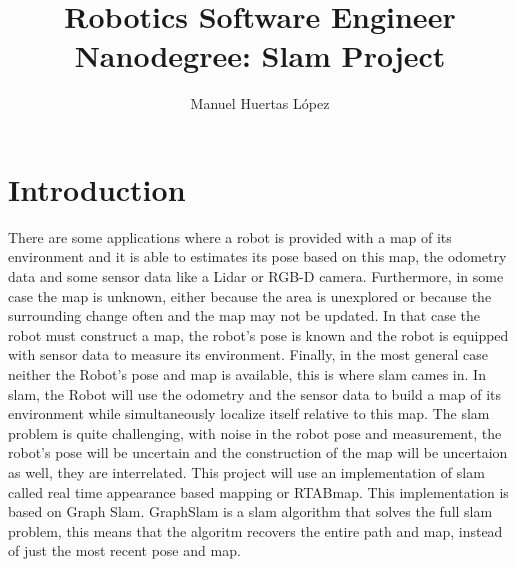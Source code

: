 \documentclass[10pt,journal,compsoc]{IEEEtran}
\begin{document}
	
\title{Robotics Software Engineer Nanodegree: Slam Project}
\author{Manuel Huertas L\'opez}

	
	
\maketitle
\IEEEdisplaynontitleabstractindextext
\IEEEpeerreviewmaketitle
\section{Introduction}
\label{sec:introduction}
\IEEEPARstart
{T}{here} are some applications where a robot is provided with a map of its environment and it is able to estimates its pose based on this map, the odometry data and some sensor data like a Lidar or RGB-D camera. Furthermore, in some case the map is unknown, either because the area is unexplored or because the surrounding change often and the map may not be updated. In that case the robot must construct a map, the robot's pose is known and the robot is equipped with sensor data to measure its environment. Finally, in the most general case neither the Robot's pose and map is available, this is where slam cames in. In slam, the Robot will use the odometry and the sensor data to build a map of its environment while simultaneously localize itself relative to this map. The slam problem is quite challenging, with noise in the robot pose and measurement, the robot's pose will be uncertain and the construction of the map will be uncertaion as well, they are interrelated. This project will use an implementation of slam called real time appearance based mapping or RTABmap. This implementation is based on Graph Slam. GraphSlam is a slam algorithm that solves the full slam problem, this means that the algoritm recovers the entire path and map, instead of just the most recent pose and map.
\end{document}
